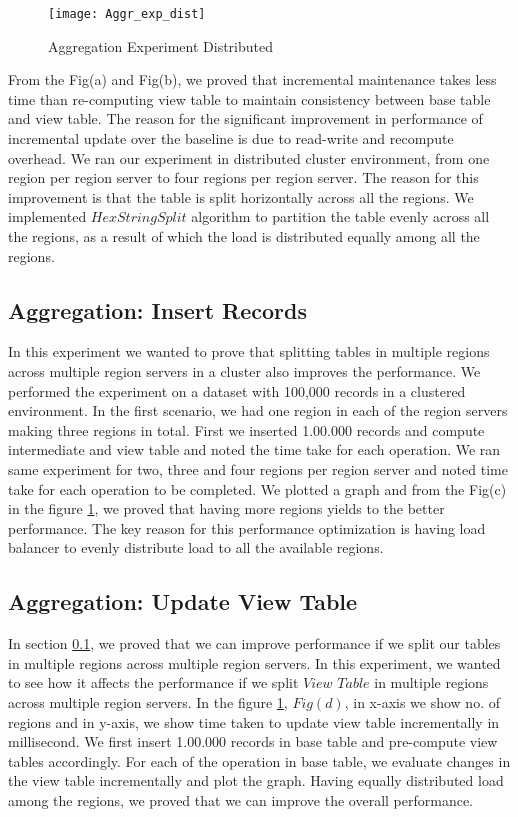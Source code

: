 \documentclass[11pt,a4paper,bibtotoc,idxtotoc,headsepline,footsepline,footexclude,BCOR12mm,DIV13]{scrbook}
\begin{document}
\begin{figure}
	\centering
	\texttt{[image: Aggr\_exp\_dist]}
	\caption{Aggregation Experiment Distributed}
	\label{sec:AggrExpDist}
	
\end{figure} 
\newpage

From the Fig(a) and Fig(b), we proved that incremental maintenance takes less time than re-computing view table to maintain consistency between base table and view table. The reason for the significant improvement in performance of incremental update over the baseline is due to read-write and recompute overhead. We ran our experiment in distributed cluster environment, from one region per region server to four regions per region server. The reason for this improvement is that the table is split horizontally across all the regions. We implemented $HexStringSplit$ algorithm  to partition the table evenly across all the regions, as a result of which the load is distributed equally among all the regions.


\subsection{Aggregation: Insert Records}
\label{Insert Records Aggr Dist}
In this experiment we wanted to prove that splitting tables in multiple regions across multiple region servers in a cluster also improves the performance. We performed the experiment on a dataset with 100,000 records in a clustered environment. In the first scenario, we had one region in each of the region servers making three regions in total. First we inserted 1.00.000 records and compute intermediate and view table and noted the time take for each operation. We ran same experiment for two, three and four regions per region server and noted time take for each operation to be completed. We plotted a graph and from the Fig(c) in the figure \ref{sec:AggrExpDist}, we proved that having more regions yields to the better performance. The key reason for this performance optimization is having load balancer to evenly distribute load to all the available regions.


\subsection{Aggregation: Update View Table} 
\label{Update View Table Aggr Dist}
In section \ref{Insert Records Aggr Dist}, we proved that we can improve performance if we split our tables in multiple regions across multiple region servers. In this experiment, we wanted to see how it affects the performance if we split $View$ $Table$ in multiple regions across multiple region servers. In the figure \ref{sec:AggrExpDist}, $Fig(d)$, in x-axis we show no. of regions and in y-axis, we show time taken to update view table incrementally in millisecond. We first insert 1.00.000 records in base table and pre-compute view tables accordingly. For each of the operation in base table, we evaluate changes in the view table incrementally and plot the graph. Having equally distributed load among the regions, we proved that we can improve the overall performance.  
\end{document}
